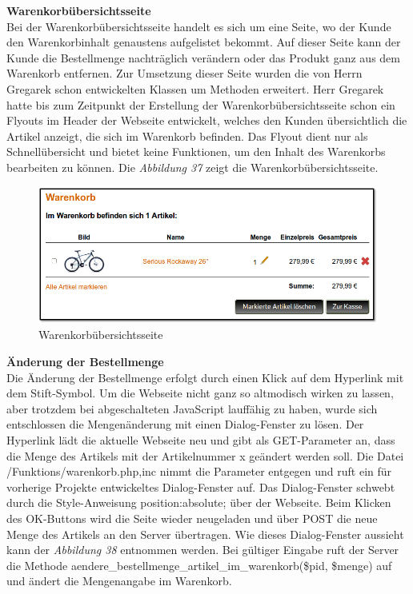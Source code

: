 \textbf{Warenkorbübersichtsseite}\\
Bei der Warenkorbübersichtsseite handelt es sich um eine Seite, wo der Kunde den Warenkorbinhalt genaustens aufgelistet bekommt. Auf dieser Seite kann der Kunde die Bestellmenge nachträglich verändern oder das Produkt ganz aus dem Warenkorb entfernen.
Zur Umsetzung dieser Seite wurden die von Herrn Gregarek schon entwickelten Klassen um Methoden erweitert. Herr Gregarek hatte bis zum Zeitpunkt der Erstellung der Warenkorbübersichtsseite schon ein Flyouts im Header der Webseite entwickelt, welches den Kunden übersichtlich die Artikel anzeigt, die sich im Warenkorb befinden. Das Flyout dient nur als Schnellübersicht und bietet keine Funktionen, um den Inhalt des Warenkorbs bearbeiten zu können. Die \textit{Abbildung 37} zeigt die Warenkorbübersichtsseite.

\begin{figure}[H]
	\begin{center}
			\includegraphics[width=130mm]{Bilder/warenkorb.png}
	\end{center}
	\caption{Warenkorbübersichtsseite}
\end{figure}

\textbf{Änderung der Bestellmenge}\\
Die Änderung der Bestellmenge erfolgt durch einen Klick auf dem Hyperlink mit dem Stift-Symbol. Um die Webseite nicht ganz so altmodisch wirken zu lassen, aber trotzdem bei abgeschalteten JavaScript lauffähig zu haben, wurde sich entschlossen die Mengenänderung mit einen Dialog-Fenster zu lösen. Der Hyperlink lädt die aktuelle Webseite neu und gibt als \glqq GET-Parameter\grqq{} an, dass die Menge des Artikels mit der Artikelnummer x geändert werden soll. Die Datei \glqq /Funktions/warenkorb.php,inc\grqq{} nimmt die Parameter entgegen und ruft ein für vorherige Projekte entwickeltes Dialog-Fenster auf. Das Dialog-Fenster schwebt durch die Style-Anweisung \glqq position:absolute;\grqq{} über der  Webseite. Beim Klicken des \glqq OK\grqq{}-Buttons wird die Seite wieder neugeladen und über \glqq POST\grqq{} die neue Menge des Artikels an den Server übertragen. Wie dieses Dialog-Fenster aussieht kann der \textit{Abbildung 38} entnommen werden. Bei gültiger Eingabe ruft der Server die Methode \glqq aendere\_bestellmenge\_artikel\_im\_warenkorb(\$pid, \$menge)\grqq{} auf und ändert die Mengenangabe im Warenkorb.

